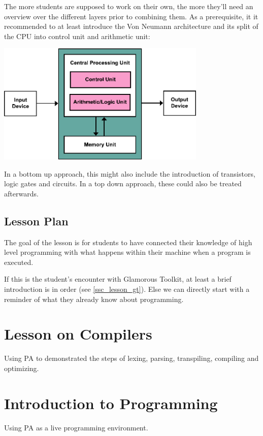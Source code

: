 The more students are supposed to work on their own, the more they'll need an overview over the different layers prior to combining them. As a prerequisite, it it recommended to at least introduce the Von Neumann architecture and its split of the CPU into control unit and arithmetic unit:

\begin{center}
\includegraphics[width=10cm]{images/Von_Neumann_Architecture.pdf}
\\ 
\end{center}

In a bottom up approach, this might also include the introduction of transistors, logic gates and circuits. In a top down approach, these could also be treated afterwards.

\subsection{Lesson Plan}
The goal of the lesson is for students to have connected their knowledge of high level programming with what happens within their machine when a program is executed.

If this is the student's encounter with Glamorous Toolkit, at least a brief introduction is in order (see \ref{ssc_lesson_gt}). Else we can directly start with a reminder of what they already know about programming.


\section{Lesson on Compilers} \label{sc_lesson_compiler}
Using PA to demonstrated the steps of lexing, parsing, transpiling, compiling and optimizing.

\section{Introduction to Programming} \label{sc_lesson_intro}
Using PA as a live programming environment.

